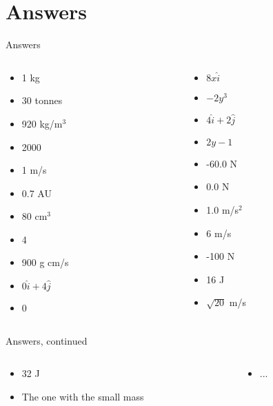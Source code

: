 \documentclass{beamer}
\begin{document}
\section{Answers}

\begin{frame}{Answers}
\begin{columns}[T]
\begin{column}{0.5\textwidth}
\begin{itemize}
\item 1 kg
\item 30 tonnes
\item 920 kg/m$^3$
\item 2000
\item 1 m/s
\item 0.7 AU
\item 80 cm$^3$
\item 4
\item 900 g cm/s
\item $0\hat{i}+4\hat{j}$
\item 0
\end{itemize}
\end{column}
\begin{column}{0.5\textwidth}
\begin{itemize}
\item $8x\hat{i}$
\item $-2y^3$
\item $4\hat{i}+2\hat{j}$
\item $2y-1$
\item -60.0 N
\item 0.0 N
\item 1.0 m/s$^2$
\item 6 m/s
\item -100 N
\item 16 J
\item $\sqrt{20}$ m/s
\end{itemize}
\end{column}
\end{columns}
\end{frame}

\begin{frame}{Answers, continued}
\begin{columns}[T]
\begin{column}{0.5\textwidth}
\begin{itemize}
\item 32 J
\item The one with the small mass
\end{itemize}
\end{column}
\begin{column}{0.5\textwidth}
\begin{itemize}
\item ...
\end{itemize}
\end{column}
\end{columns}
\end{frame}
\end{document}

